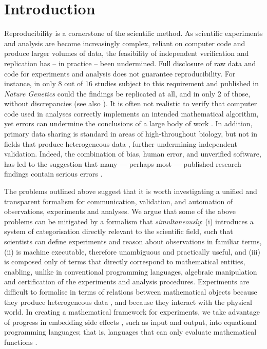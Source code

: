 \documentclass[11pt]{article}
\begin{document}
\pagebreak

\section*{Introduction}

Reproducibility is a cornerstone of the scientific method. As
scientific experiments and analysis are become increasingly complex,
reliant on computer code and produce larger volumes of data, the
feasibility of independent verification and replication has -- in
practice -- been undermined. Full disclosure of raw data and code for
experiments and analysis does not guarantee reproducibility.  For
instance, in only 8 out of 16 studies subject to this requirement and
published in \emph{Nature Genetics} could the findings be replicated
at all, and in only 2 of those, without discrepancies
\cite{Ioannidis2008} (see also \cite{Baggerly2009,
  McCullough2007}). It is often not realistic to verify that computer
code used in analyses correctly implements an intended mathematical
algorithm, yet errors can undermine the conclusions of a
large body of work \cite{Chang2006}.  In addition, primary data
sharing is standard in areas of high-throughout biology, but
not in fields that produce heterogeneous data \cite{Gardner2005},
further undermining independent validation.  Indeed, the combination
of bias, human error, and unverified software, has led to the
suggestion that many --- perhaps most --- published research findings
contain serious errors \cite{Ioannidis2005, Merali2010}.

The problems outlined above suggest that it is worth investigating a
unified and transparent formalism for communication, validation, and
automation of observations, experiments and analyses. We argue that
some of the above problems can be mitigated by a formalism that
\emph{simultaneously}: (i) introduces a system of categorisation
directly relevant to the scientific field, such that scientists can
define experiments and reason about observations in familiar terms,
(ii) is machine executable, therefore unambiguous and practically
useful, and (iii) is composed only of terms that directly correspond
to mathematical entities, enabling, unlike in conventional programming
languages, algebraic manipulation and certification of the experiments
and analysis procedures.  Experiments are difficult to formalise in
terms of relations between mathematical objects because they produce
heterogeneous data \cite{Tukey1962}, and because they interact with
the physical world. In creating a mathematical framework for
experiments, we take advantage of progress in embedding side effects
\cite{PeytonJones2002, Roy2004, Wadler1995}, such as input and output,
into equational programming languages; that is, languages that can
only evaluate mathematical functions \cite{Church1941}.
\end{document}
